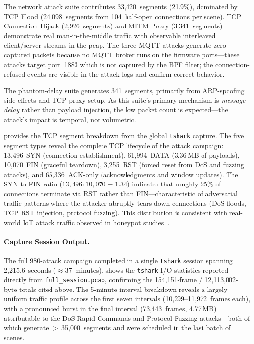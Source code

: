 The network attack suite contributes 33{,}420~segments (21.9\%),
dominated by TCP Flood (24{,}098~segments from 104~half-open
connections per scene).  TCP Connection Hijack (2{,}926~segments)
and MITM Proxy (3{,}341~segments) demonstrate real man-in-the-middle
traffic with observable interleaved client/server streams in the
pcap.  The three MQTT attacks generate zero captured packets because
no MQTT broker runs on the firmware ports---these attacks target
port~1883 which is not captured by the BPF filter; the
connection-refused events are visible in the attack logs and
confirm correct behavior.

The phantom-delay suite generates 341~segments, primarily from
ARP-spoofing side effects and TCP proxy setup.  As this suite's
primary mechanism is \emph{message delay} rather than payload
injection, the low packet count is expected---the attack's impact
is temporal, not volumetric.



 provides the TCP segment breakdown
from the global \texttt{tshark} capture.  The five segment types
reveal the complete TCP lifecycle of the attack campaign:
13{,}496~SYN (connection establishment), 61{,}994~DATA
(3.36\,MB of payloads), 10{,}070~FIN (graceful teardown),
3{,}255~RST (forced reset from DoS and fuzzing attacks), and
65{,}336~ACK-only (acknowledgments and window updates).  The
SYN-to-FIN ratio ($13{,}496 : 10{,}070 = 1.34$) indicates that
roughly 25\% of connections terminate via RST rather than
FIN---characteristic of adversarial traffic patterns where
the attacker abruptly tears down connections (DoS floods,
TCP RST injection, protocol fuzzing).  This distribution is
consistent with real-world IoT attack traffic observed in
honeypot studies~\cite{honeypot-iot}.

\paragraph{Capture Session Output.}
The full 980-attack campaign completed in a single
\texttt{tshark} session spanning 2{,}215.6~seconds
($\approx$37~minutes).
 shows the \texttt{tshark} I/O statistics
reported directly from \texttt{full\_session.pcap}, confirming
the 154{,}151-frame / 12{,}113{,}002-byte totals cited above.
The 5-minute interval breakdown reveals a largely uniform
traffic profile across the first seven intervals
(10{,}299--11{,}972~frames each), with a pronounced burst in the
final interval (73{,}443~frames, 4.77\,MB) attributable to
the DoS Rapid Commands and Protocol Fuzzing attacks---both of which
generate $>$\,35{,}000~segments and were scheduled in the last
batch of scenes.

